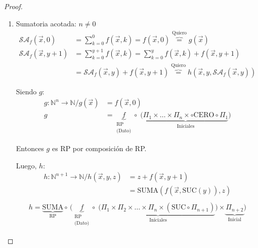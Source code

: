 \begin{proof} \phantom{.}
    \begin{enumerate}
        \item Sumatoria acotada: $n \neq 0$
            \begin{align*}
                \mathcal{SA}_f (\overrightarrow{x},0) &= \sum_{k=0}^0 f(
                \overrightarrow{x},k) = f(\overrightarrow{x}, 0)
                \overbrace{=}^{\text{Quiero}} g(\overrightarrow{x}) \\
                \mathcal{SA}_f (\overrightarrow{x},y+1) &= \sum_{k=0}^{y+1} f(
                \overrightarrow{x},k) = \sum_{k=0}^{y} f(
                \overrightarrow{x},k) + f(\overrightarrow{x}, y+1) \\
                &= \mathcal{SA}_f (\overrightarrow{x},y) + 
                f(\overrightarrow{x}, y+1) \overbrace{=}^{\text{Quiero}}
                h(\overrightarrow{x}, y, \mathcal{SA}_f(\overrightarrow{x},y))
            \end{align*}

            Siendo $g$:
            \begin{align*}
                g: \mathbb{N}^n \to \mathbb{N} / g(\overrightarrow{x}) &=
                f(\overrightarrow{x}, 0) \\
                g &= \underbrace{f}_{\substack{\text{RP}\\ \text{(Dato)}}}
                \circ \;
                \big(\underbrace{\Pi_1 \times \dots \times \Pi_n \times \circ 
                \mathrm{CERO} \circ \Pi_1}_{\text{Iniciales}} \big)
            \end{align*}

            Entonces $g$ es RP por composición de RP.

            Luego, $h$:
            \begin{align*}
                h: \mathbb{N}^{n+1} \to \mathbb{N} / h(\overrightarrow{x},y,z)
                &= z + f(\overrightarrow{x},y+1) \\
                &= \mathrm{SUMA}(f(\overrightarrow{x}, \mathrm{SUC}(y)), z) \\
            \end{align*}
            \begin{gather*}
                h = \underbrace{\mathrm{SUMA}}_{\text{RP}} \circ \,
                \Big( \underbrace{f}_{\substack{\text{RP}\\ \text{(Dato)}}} 
                \circ \;
                \big( \underbrace{\Pi_1 \times \Pi_2 \times \dots \times 
                \Pi_n \times 
                (\mathrm{SUC} \circ \Pi_{n+1})}_{\text{Iniciales}} \big)
                \times \underbrace{\Pi_{n+2}}_{\text{Inicial}} \Big) 
            \end{gather*}


\end{enumerate}
\end{proof}
